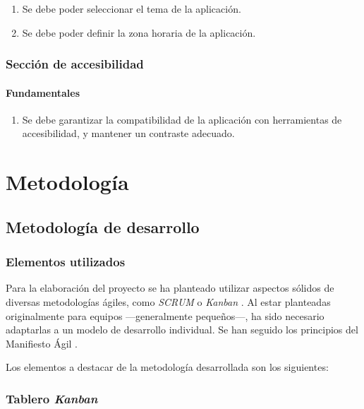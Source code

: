 \documentclass[10pt, a4paper]{aqademic}
\begin{document}
\begin{enumerate}[resume]
	\item Se debe poder seleccionar el tema de la aplicación.
	
	\item Se debe poder definir la zona horaria de la aplicación.	
\end{enumerate}


\subsection*{Sección de accesibilidad}

\subsubsection*{Fundamentales}

\begin{enumerate}[resume]
	\item Se debe garantizar la compatibilidad de la aplicación con herramientas de accesibilidad, y mantener un contraste adecuado.
\end{enumerate}


\chapter{Metodología}

\section{Metodología de desarrollo}

\subsection{Elementos utilizados}

Para la elaboración del proyecto se ha planteado utilizar aspectos sólidos de diversas metodologías ágiles, como \textit{SCRUM} \cite{schwaber2017scrum} o \textit{Kanban} \cite{kanban}. Al estar planteadas originalmente para equipos ---generalmente pequeños---, ha sido necesario adaptarlas a un modelo de desarrollo individual. Se han seguido los principios del Manifiesto Ágil \cite{beck2001agile}.

\medskip

Los elementos a destacar de la metodología desarrollada son los siguientes:

\subsection*{Tablero \textit{Kanban}}
\end{document}
